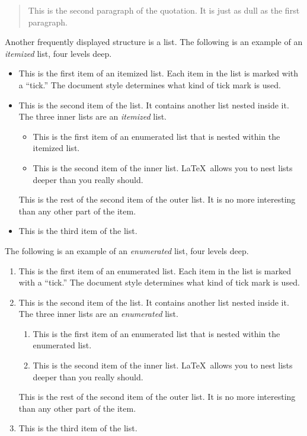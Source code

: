 \documentclass[aoas,preprint]{imsart}
\numberwithin{equation}{section}
\theoremstyle{plain}
\begin{document}
{\begin{quotation}
   This is the second paragraph of the quotation.  It is just
   as dull as the first paragraph.
\end{quotation}
Another frequently displayed structure is a list.
The following is an example of an {\em itemized} list, 
four levels deep.
\begin{itemize}
\item  This is the first item of an itemized list.  Each item
      in the list is marked with a ``tick.''  The document
      style determines what kind of tick mark is used.
\item  This is the second item of the list.  It contains another
      list nested inside it.  The three inner lists are an {\em itemized}
      list.
    \begin{itemize}
       \item This is the first item of an enumerated list that
            is nested within the itemized list.
          \item This is the second item of the inner list.  \LaTeX\
            allows you to nest lists deeper than you really should.
      \end{itemize}
      This is the rest of the second item of the outer list.  It
      is no more interesting than any other part of the item.
   \item  This is the third item of the list.
\end{itemize}


The following is an example of an {\em enumerated} list, four levels deep.
\begin{enumerate}
\item  This is the first item of an enumerated list.  Each item
      in the list is marked with a ``tick.''  The document
      style determines what kind of tick mark is used.
\item  This is the second item of the list.  It contains another
      list nested inside it.  The three inner lists are an {\em enumerated}
      list.
    \begin{enumerate}
       \item This is the first item of an enumerated list that
            is nested within the enumerated list.
          \item This is the second item of the inner list.  \LaTeX\
            allows you to nest lists deeper than you really should.
      \end{enumerate}
      This is the rest of the second item of the outer list.  It
      is no more interesting than any other part of the item.
   \item  This is the third item of the list.
\end{enumerate}


}
\end{document}
